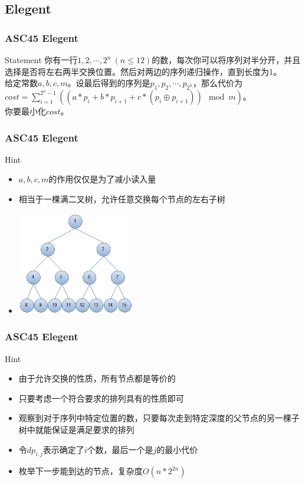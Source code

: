 \documentclass{beamer}
\begin{document}
\subsection{Elegent}
\begin{frame}
  \frametitle{ASC45 Elegent}
  \begin{block}{Statement}
    \setlength{\parindent}{2em}
    你有一行$1,2,\cdots,2^n\ (n\le 12)$的数，每次你可以将序列对半分开，并且选择是否将左右两半交换位置。然后对两边的序列递归操作，直到长度为1。\\
    给定常数$a,b,c,m$。设最后得到的序列是$p_1,p_2,\cdots,p_{2^n}$，那么代价为$cost=\sum_{i=1}^{2^n-1}((a*p_i+b*p_{i+1}+c*(p_i\oplus p_{i+1}))\mod m)$。\\
    你要最小化$cost$。
  \end{block}
\end{frame}

\begin{frame}
  \frametitle{ASC45 Elegent}
  \begin{block}{Hint}
    \begin{itemize}
    \item $a,b,c,m$的作用仅仅是为了减小读入量 \pause
    \item 相当于一棵满二叉树，允许任意交换每个节点的左右子树 \pause
      \vspace{0.7em}
    \item \includegraphics[width=0.4\textwidth]{full.png}
    \end{itemize}
  \end{block}
\end{frame}

\begin{frame}
  \frametitle{ASC45 Elegent}
  \begin{block}{Hint}
    \begin{itemize}
    \item 由于允许交换的性质，所有节点都是等价的 \pause
    \item 只要考虑一个符合要求的排列具有的性质即可 \pause
    \item 观察到对于序列中特定位置的数，只要每次走到特定深度的父节点的另一棵子树中就能保证是满足要求的排列 \pause
    \item 令$dp_{i,j}$表示确定了$i$个数，最后一个是$j$的最小代价 \pause
    \item 枚举下一步能到达的节点，复杂度$O(n*2^{2n})$
    \end{itemize}
  \end{block}
\end{frame}
\end{document}
